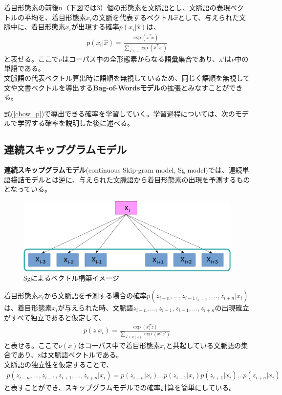 着目形態素の前後n（下図では3）個の形態素を文脈語とし、文脈語の表現ベクトルの平均を、着目形態素$x_i$の文脈を代表するベクトル$\hat{x}$として、与えられた文脈中に、着目形態素$x_i$が出現する確率$p(x_i|\hat{x})$は、
\begin{eqnarray}
  \label{cbow_p}
  p(x_i|\widehat{x}) = \frac{\exp(\hat{x}^Tx)}{\sum_{x'\in\nu}\exp(\hat{x}^Tx')}
\end{eqnarray}
と表せる。ここで$\nu$はコーパス中の全形態素からなる語彙集合であり、x'は$\nu$中の単語である。\\
文脈語の代表ベクトル算出時に語順を無視しているため、同じく語順を無視して文や文書ベクトルを導出する\textbf{Bag-of-Wordsモデル}の拡張とみなすことができる。

式(\ref{cbow_p})で導出できる確率を学習していく。学習過程については、次のモデルで学習する確率を説明した後に述べる。

\subsection{連続スキップグラムモデル}
\textbf{連続スキップグラムモデル}(continuous Skip-gram model, Sg model)では、連続単語袋詰モデルとは逆に、与えられた文脈語から着目形態素の出現を予測するものとなっている。
\begin{figure}[h]
  \centering
  \includegraphics[width=12.5cm]{../images/Sg.eps}
  \caption{Sgによるベクトル構築イメージ}
\end{figure}

着目形態素$x_i$から文脈語を予測する場合の確率$p(z_{i-n},...,z_{i-1},_{i+1},...,z_{i+n}|x_i)$は、着目形態素$x_i$が与えられた時、文脈語$z_{i-n},...,z_{i-1},z_{i+1},...,z_{i+n}$の出現確立がすべて独立であると仮定して、
\begin{eqnarray}
  \label{cskip_p}
  p(z|x_i) = \frac{\exp(x_i^Tz)}{\sum_{z'\in\nu(x)}\exp(x^Tz')}
\end{eqnarray}
と表せる。ここで$\nu(x)$はコーパス中で着目形態素$x_i$と共起している文脈語の集合であり、zは文脈語ベクトルである。\\
文脈語の独立性を仮定することで、
\begin{eqnarray}
  p(z_{i-n},...,z_{i-1},z_{i+1},...,z_{i+n}|x_i) = p(z_{i-n}|x_i)...p(z_{i-1}|x_i)p(z_{i+1}|x_i)...p(z_{i+n}|x_i) \nonumber
\end{eqnarray}
と表すことができ、スキップグラムモデルでの確率計算を簡単にしている。

